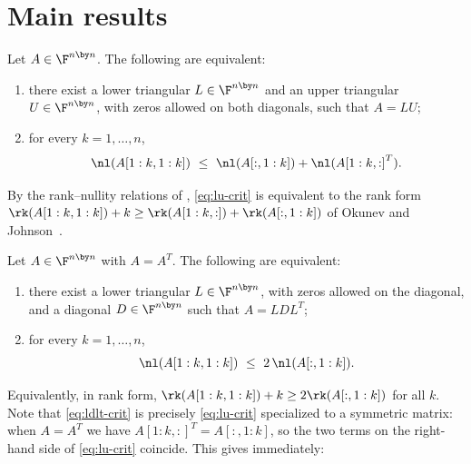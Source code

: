 \section{Main results}\label{sec:results}

\begin{theorem}[unpivoted LU]\label{thm:lu}
  Let $A \in \F^{n \by n}$.  The following are equivalent:
  \begin{enumerate}
    \item there exist a lower triangular $L \in \F^{n \by n}$ and an upper
      triangular $U \in \F^{n \by n}$, with zeros allowed on both diagonals,
      such that $A = LU$;
    \item for every $k = 1, \ldots, n$,
      \begin{equation}\label{eq:lu-crit}
        \nl(A[1:k,1:k]) \ \le\ \nl(A[:,1:k]) + \nl({A[1:k,:]}^T) .
      \end{equation}
  \end{enumerate}
\end{theorem}

By the rank--nullity relations of , \cref{eq:lu-crit} is
equivalent to the rank form
$\rk(A[1:k,1:k]) + k \ge \rk(A[1:k,:]) + \rk(A[:,1:k])$ of Okunev and
Johnson~\cite{okunev_johnson_2005,johnson_okunev_2025}.

\begin{theorem}\label{thm:ldlt}
  Let $A \in \F^{n \by n}$ with $A = A^T$.  The following are equivalent:
  \begin{enumerate}
    \item there exist a lower triangular $L \in \F^{n \by n}$, with zeros
      allowed on the diagonal, and a diagonal $D \in \F^{n \by n}$ such that
      $A = LDL^T$;
    \item for every $k = 1, \ldots, n$,
      \begin{equation}\label{eq:ldlt-crit}
        \nl(A[1:k,1:k]) \ \le\ 2 \, \nl(A[:,1:k]) .
      \end{equation}
  \end{enumerate}
\end{theorem}

Equivalently, in rank form, $\rk(A[1:k,1:k]) + k \ge 2 \rk(A[:,1:k])$ for
all $k$.  Note that \cref{eq:ldlt-crit} is precisely \cref{eq:lu-crit}
specialized to a symmetric matrix: when $A = A^T$ we have
${A[1:k,:]}^T = A[:,1:k]$, so the two terms on the right-hand side of
\cref{eq:lu-crit} coincide.  This gives immediately:

